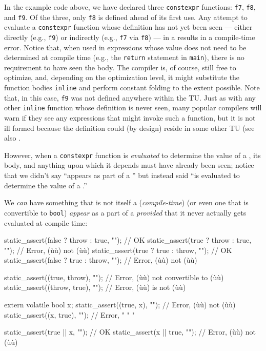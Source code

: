 \noindent In the example code above, we have declared three \lstinline!constexpr!
functions: \lstinline!f7!, \lstinline!f8!, and \lstinline!f9!. Of the three, only
\lstinline!f8! is defined ahead of its first use. Any attempt to evaluate a
\lstinline!constexpr! function whose definition has not yet been seen ---
either directly (e.g., \lstinline!f9!) or indirectly (e.g., \lstinline!f7! via
\lstinline!f8!) --- in a  results in a
compile-time error. Notice that, when used in expressions whose value
does not need to be determined at compile time (e.g., the
\lstinline!return! statement in \lstinline!main!), there is no requirement to
have seen the body. The compiler is, of course, still free to optimize,
and, depending on the optimization level, it might substitute the
function bodies \lstinline!inline! and perform constant folding to the
extent possible. Note that, in this case, \lstinline!f9! was not defined
anywhere within the TU. Just as with any other \lstinline!inline! function
whose definition is never seen, many popular compilers will warn if they
see any expressions that might invoke such a function, but it is not ill
formed because the definition could (by design) reside in some other TU
(see also .

However, when a \lstinline!constexpr! function is \emph{evaluated} to
determine the value of a , its body, and
anything upon which it depends must have already been seen; notice that
we didn't say ``appears as part of a '' but
instead said ``is evaluated to determine the value of a .''

We \emph{can} have something that is not itself a (\emph{compile-time})
 (or even one that is convertible to
\lstinline!bool!) \emph{appear} as a part of a 
\emph{provided} that it never actually gets evaluated at compile time:

\begin{emcppslisting}
static_assert(false ? throw : true,  "");  // OK
static_assert(true  ? throw : true,  "");  // Error, (ù{}ù) not (ù{}ù)
static_assert(true  ?  true : throw, "");  // OK
static_assert(false ?  true : throw, "");  // Error, (ù{}ù) not (ù{}ù)

static_assert((true, throw), "");  // Error, (ù{}ù) not convertible to (ù{}ù)
static_assert((throw, true), "");  // Error, (ù{}ù) is not (ù{}ù)

extern volatile bool x;
static_assert((true, x), "");      // Error, (ù{}ù) not (ù{}ù)
static_assert((x, true), "");      // Error,  "   "      "

static_assert(true || x,    "");   // OK
static_assert(x    || true, "");   // Error, (ù{}ù) not (ù{}ù)
\end{emcppslisting}


